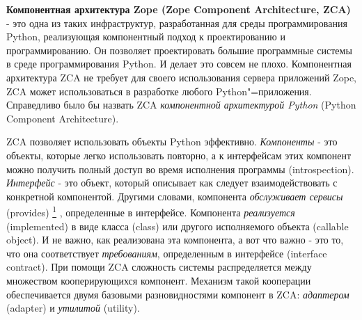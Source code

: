 \documentclass[a4paper,openany,twoside,draft]{book}
\providecommand*{\DUfootnotemark}[3]{%
  \raisebox{1em}{\hypertarget{#1}{}}%
  \hyperlink{#2}{\textsuperscript{#3}}%
}
\providecommand*{\DUroletitlereference}[1]{\textsl{#1}}
\begin{document}
\textbf{Компонентная архитектура Zope (Zope Component Architecture, ZCA)} - это одна из таких инфраструктур, разработанная для среды программирования Python, реализующая компонентный подход к проектированию и программированию.  Он позволяет проектировать большие программные системы в среде программирования Python.  И делает это совсем не плохо.  Компонентная архитектура ZCA не требует для своего использования сервера приложений Zope, ZCA может использоваться в разработке любого Python"=приложения.  Справедливо было бы назвать ZCA \DUroletitlereference{компонентной архитектурой Python} (Python Component Architecture).

ZCA позволяет использовать объекты Python эффективно.  \DUroletitlereference{Компоненты} - это объекты, которые легко использовать повторно, а к интерфейсам этих компонент можно получить полный доступ во время исполнения программы (introspection).  \DUroletitlereference{Интерфейс} - это объект, который описывает как следует взаимодействовать с конкретной компонентой.  Другими словами, компонента \DUroletitlereference{обслуживает сервисы} (provides)\DUfootnotemark{id3}{fn1}{1}, определенные в интерфейсе.  Компонента \DUroletitlereference{реализуется} (implemented) в виде класса (class) или другого исполняемого объекта (callable object).  И не важно, как реализована эта компонента, а вот что важно - это то, что она соответствует \DUroletitlereference{требованиям}, определенным в интерфейсе (interface contract).  При помощи ZCA сложность системы распределяется между множеством кооперирующихся компонент.  Механизм такой кооперации обеспечивается двумя базовыми разновидностями компонент в ZCA: \DUroletitlereference{адаптером} (adapter) и \DUroletitlereference{утилитой} (utility).
\end{document}
